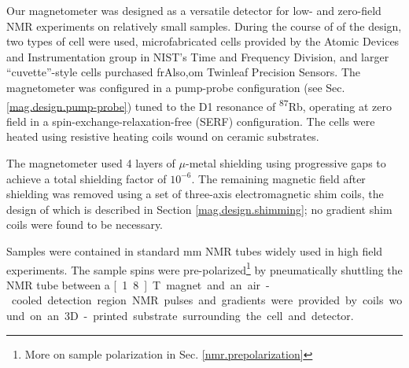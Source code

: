 \documentclass[PaulGanssle-Thesis.tex]{subfiles}
\begin{document}
Our magnetometer was designed as a versatile detector for low- and zero-field NMR experiments on relatively small samples. During the course of of the design, two types of cell were used, microfabricated cells provided by the Atomic Devices and Instrumentation group in NIST's Time and Frequency Division, and larger ``cuvette''-style cells purchased frAlso,om Twinleaf Precision Sensors. The magnetometer was configured in a pump-probe configuration (see Sec. \ref{mag.design.pump-probe}) tuned to the D1 resonance of \textsuperscript{87}Rb, operating at zero field in a spin-exchange-relaxation-free (SERF) configuration\cite{Allred2002}. The cells were heated using resistive heating coils wound on ceramic substrates.

The magnetometer used 4 layers of $\mu$-metal shielding using progressive gaps\cite{Dubbers1986} to achieve a total shielding factor of $10^{-6}$. The remaining magnetic field after shielding was removed using a set of three-axis electromagnetic shim coils, the design of which is described in Section \ref{mag.design.shimming}; no gradient shim coils were found to be necessary.

Samples were contained in standard \unit[5]{mm} NMR tubes widely used in high field experiments. The sample spins were pre-polarized\footnote{More on sample polarization in Sec. \ref{nmr.prepolarization}} by pneumatically shuttling the NMR tube between a \unit[1.8]{T} magnet and an air-cooled detection region. NMR pulses and gradients were provided by coils wound on an 3D-printed substrate. surrounding the cell and detector.
\end{document}
